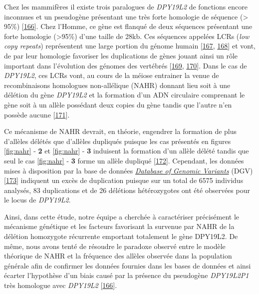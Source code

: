 \documentclass[12pt,twoside]{ugathesis}
\theoremstyle{definition}
\theoremstyle{definition}
\theoremstyle{remark}
\begin{document}
Chez les mammifères il existe trois paralogues de \emph{DPY19L2} de
fonctions encore inconnues et un pseudogène présentant une très forte
homologie de séquence (\textgreater{} 95\%)
{[}\protect\hyperlink{ref-Carson2006}{166}{]}. Chez l'Homme, ce gène est
flanqué de deux séquences présentant une forte homologie
(\textgreater{}95\%) d'une taille de 28kb. Ces séquences appelées LCRs
(\emph{low copy repeats}) représentent une large portion du génome
humain {[}\protect\hyperlink{ref-Cheung2003}{167},
\protect\hyperlink{ref-Bailey2002}{168}{]} et vont, de par leur
homologie favoriser les duplications de gènes jouant ainsi un rôle
important dans l'évolution des génomes des vertébrés
{[}\protect\hyperlink{ref-Walsh2003}{169},
\protect\hyperlink{ref-Ohno1970}{170}{]}. Dans le cas de \emph{DPY19L2},
ces LCRs vont, au cours de la méiose entrainer la venue de
recombinaisons homologues non-allélique (NAHR) donnant lieu soit à une
délétion du gène \emph{DPY19L2} et la formation d'un ADN circulaire
comprenant le gène soit à un allèle possédant deux copies du gène tandis
que l'autre n'en possède aucune
{[}\protect\hyperlink{ref-Harbuz2011a}{171}{]}.

Ce mécanisme de NAHR devrait, en théorie, engendrer la formation de plus
d'allèles délétés que d'allèles dupliqués puisque les cas présentés en
figures \ref{fig:nahr} - \textbf{2} et \ref{fig:nahr} - \textbf{3}
induisent la formation d'un allèle délété tandis que seul le cas
\ref{fig:nahr} - \textbf{3} forme un allèle dupliqué
{[}\protect\hyperlink{ref-Liu2012}{172}{]}. Cependant, les données mises
à disposition par la base de données
\href{http://dgv.tcag.ca/dgv/app/home}{\emph{Database of Genomic
Variants}} (DGV) {[}\protect\hyperlink{ref-MacDonald2014}{173}{]}
indiquent un excès de duplication puisque sur un total de 6575 individus
analysés, 83 duplications et de 26 délétions hétérozygotes ont été
observées pour le locus de \emph{DPY19L2}.

Ainsi, dans cette étude, notre équipe a cherchée à caractériser
précisément le mécanisme génétique et les facteurs favorisant la
survenue par NAHR de la délétion homozygote récurrente emportant
totalement le gène DPY19L2. De même, nous avons tenté de résoudre le
paradoxe observé entre le modèle théorique de NAHR et la fréquence des
allèles observée dans la population générale afin de confirmer les
données fournies dans les bases de données et ainsi écarter l'hypothèse
d'un biais causé par la présence du pseudogène \emph{DPY19L2P1} très
homologue avec \emph{DPY19L2}
{[}\protect\hyperlink{ref-Carson2006}{166}{]}.
\end{document}
